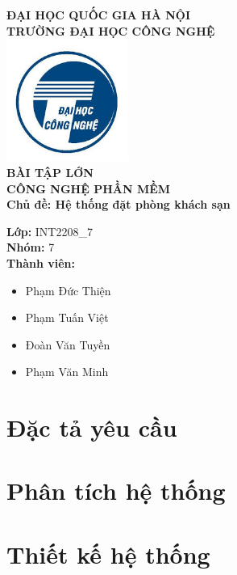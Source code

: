 \documentclass[a4paper,12pt,oneside]{report}
\begin{document}

\begin{center}
    \textbf{ĐẠI HỌC QUỐC GIA HÀ NỘI} \\
    \textbf{TRƯỜNG ĐẠI HỌC CÔNG NGHỆ} \\[3em]

    \includegraphics[width=0.3\textwidth]{img/logo.png} \\[3em]

    \LARGE \textbf{BÀI TẬP LỚN} \\[0.5em]
    \Large \textbf{CÔNG NGHỆ PHẦN MỀM} \\[0.5em]
    \normalsize \textbf{Chủ đề: Hệ thống đặt phòng khách sạn} \\[4em]
\end{center}

\vspace{2em}

\hfill
\begin{minipage}{0.45\textwidth}
    \textbf{Lớp:} INT2208\_7 \\
    \textbf{Nhóm:} 7 \\
    \textbf{Thành viên:}
    \begin{itemize}
        \item Phạm Đức Thiện
        \item Phạm Tuấn Việt
        \item Đoàn Văn Tuyền
        \item Phạm Văn Minh
    \end{itemize}
\end{minipage}

\vfill

\begin{center}
    \thepage
\end{center}

\tableofcontents

\chapter{Đặc tả yêu cầu}

\chapter{Phân tích hệ thống}

\chapter{Thiết kế hệ thống}

\end{document}
